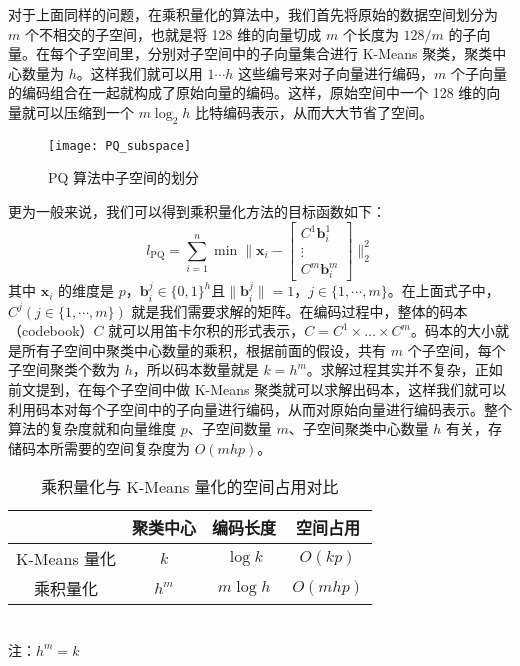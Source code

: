 对于上面同样的问题，在乘积量化的算法中，我们首先将原始的数据空间划分为 $m$ 个不相交的子空间，也就是将 128 维的向量切成 $m$ 个长度为 $128/m$ 的子向量。在每个子空间里，分别对子空间中的子向量集合进行 K-Means 聚类，聚类中心数量为 $h$。这样我们就可以用 $1\cdots h$ 这些编号来对子向量进行编码，$m$ 个子向量的编码组合在一起就构成了原始向量的编码。这样，原始空间中一个 128 维的向量就可以压缩到一个 $m\log_2h$ 比特编码表示，从而大大节省了空间。
\begin{figure}[H]
  \centering
  \texttt{[image: PQ\_subspace]}
  \caption{PQ 算法中子空间的划分}
  \label{fig:PQ_subspace}
\end{figure}
更为一般来说，我们可以得到乘积量化方法的目标函数如下：
\begin{equation}
\mathit{l}_\mathrm{PQ} = \sum_{i=1}^n\min\Bigg\lVert \mathbf{x}_i - \begin{bmatrix}C^1\mathbf{b}^1_i\\\vdots\\C^m\mathbf{b}^m_i\end{bmatrix} \Bigg\rVert _2^2
\end{equation}
其中 $\mathbf{x}_i$ 的维度是 $p$，$\mathbf{b}^j_i \in \{0,1\}^h$且$\lVert\mathbf{b}^j_i\rVert=1$，$j \in \{1,\cdots,m\}$。在上面式子中，$C^j(j\in \{1,\cdots,m\})$ 就是我们需要求解的矩阵。在编码过程中，整体的码本（codebook）$C$ 就可以用笛卡尔积的形式表示，$C = C^1 \times \ldots \times C^m$。码本的大小就是所有子空间中聚类中心数量的乘积，根据前面的假设，共有 $m$ 个子空间，每个子空间聚类个数为 $h$，所以码本数量就是 $k = h^m$。求解过程其实并不复杂，正如前文提到，在每个子空间中做 K-Means 聚类就可以求解出码本，这样我们就可以利用码本对每个子空间中的子向量进行编码，从而对原始向量进行编码表示。整个算法的复杂度就和向量维度 $p$、子空间数量 $m$、子空间聚类中心数量 $h$ 有关，存储码本所需要的空间复杂度为 $O(mhp)$。
\begin{table}[htbp]
  \centering
  \caption{乘积量化与 K-Means 量化的空间占用对比}
  \label{tab:kmean_pq}
  \begin{minipage}[t]{0.61\textwidth}
    \begin{tabular}{|c|c|c|c|}
      \hline
                    & 聚类中心 & 编码长度& 空间占用\\
      \hline
      K-Means 量化  &  $k$ &   $\log k$&   $O(kp)$\\
      乘积量化      &   $h^m$ &   $m\log h$ &  $O(mhp)$\\
      \hline
    \end{tabular}\\[2pt]
    \footnotesize 注：$h^m = k$
  \end{minipage}
\end{table}

